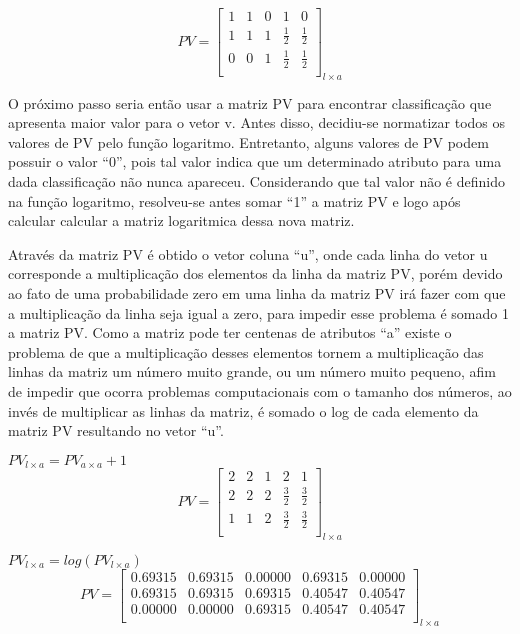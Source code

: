 \begin{anexosenv}
$$PV=\left[
\begin{array}{ccccc}
1 & 1 & 0 & 1 & 0 \\
1 & 1 & 1 & \frac{1}{2} & \frac{1}{2} \\
0 & 0 & 1 & \frac{1}{2} & \frac{1}{2} \\
\end{array}
\right]_{l \times a}$$

O próximo passo seria então usar a matriz PV para encontrar classificação que
apresenta maior valor para o vetor v. Antes disso, decidiu-se normatizar todos
os valores de PV pelo função logaritmo. Entretanto, alguns valores de PV podem
possuir o valor ``0'', pois tal valor indica que um determinado atributo para
uma dada classificação não nunca apareceu. Considerando que tal valor não é
definido na função logaritmo, resolveu-se antes somar ``1'' a matriz PV e logo
após calcular calcular a matriz logaritmica dessa nova matriz.

Através da matriz PV é obtido o vetor coluna ``u'', onde cada linha
do vetor u corresponde a multiplicação dos elementos da linha da matriz
PV, porém devido ao fato de uma probabilidade zero em uma linha da matriz
PV irá fazer com que a multiplicação da linha seja igual a zero, para
impedir esse problema é somado 1 a matriz PV. Como a matriz pode ter
centenas de atributos ``a'' existe o problema de que a multiplicação
desses elementos tornem a multiplicação das linhas da matriz um número
muito grande, ou um número muito pequeno, afim de impedir que ocorra
problemas computacionais com o tamanho dos números, ao invés de multiplicar
as linhas da matriz, é somado o log de cada elemento da matriz PV resultando
no vetor ``u''.

\begin{center}
$PV_{l \times a} = PV_{a \times a} + 1$
$$PV=\left[
\begin{array}{ccccc}
2 & 2 & 1 & 2 & 1 \\
2 & 2 & 2 & \frac{3}{2} & \frac{3}{2} \\
1 & 1 & 2 & \frac{3}{2} & \frac{3}{2} \\
\end{array}
\right]_{l \times a}$$
\end{center}

\begin{center}
$PV_{l \times a} = log(PV_{l \times a})$
$$PV=\left[
\begin{array}{ccccc}
0.69315 & 0.69315 & 0.00000 & 0.69315 & 0.00000 \\
0.69315 & 0.69315 & 0.69315 & 0.40547 & 0.40547 \\
0.00000 & 0.00000 & 0.69315 & 0.40547 & 0.40547 \\
\end{array}
\right]_{l \times a}$$
\end{center}


\end{anexosenv}
